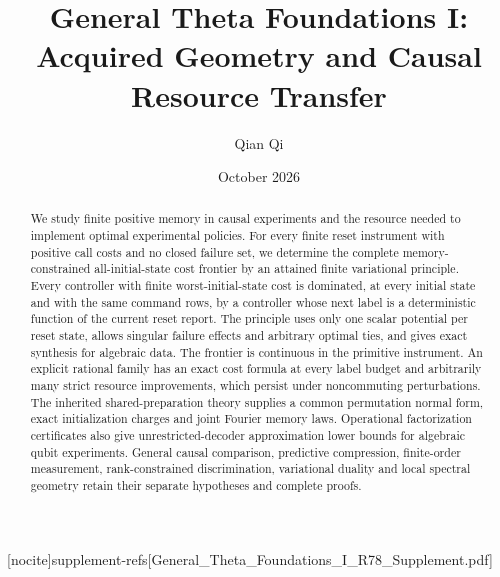 
[nocite]{supplement-refs}[General_Theta_Foundations_I_R78_Supplement.pdf]
\title[Acquired geometry and causal resource transfer]{General Theta Foundations I:\\Acquired Geometry and Causal Resource Transfer}
\author{Qian Qi}\date{October 2026}

\begin{abstract}
We study finite positive memory in causal experiments and the resource
needed to implement optimal experimental policies.  For every finite
reset instrument with positive call costs and no closed failure set,
we determine the complete memory-constrained all-initial-state cost
frontier by an attained finite variational principle.  Every controller
with finite worst-initial-state cost is dominated, at every initial state and with the same command
rows, by a controller whose next label is a deterministic function of
the current reset report.  The principle uses only one scalar potential
per reset state, allows singular failure effects and arbitrary optimal
ties, and gives exact synthesis for algebraic data.  The frontier is
continuous in the primitive instrument.  An explicit rational family
has an exact cost formula at every label budget and arbitrarily many
strict resource improvements, which persist under noncommuting
perturbations.  The inherited shared-preparation theory supplies a
common permutation normal form, exact initialization charges and joint
Fourier memory laws.  Operational factorization certificates also give
unrestricted-decoder approximation lower bounds for algebraic qubit
experiments.  General causal comparison, predictive compression,
finite-order measurement, rank-constrained discrimination, variational
duality and local spectral geometry retain their separate hypotheses
and complete proofs.
\end{abstract}
\maketitle












